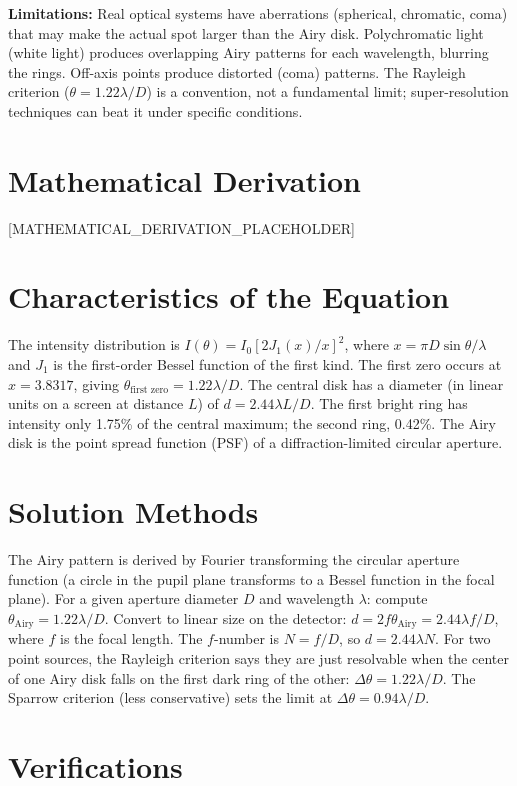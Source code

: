 \documentclass[11pt,openright]{book}
\begin{document}
\textbf{Limitations:} Real optical systems have aberrations (spherical, chromatic, coma) that may make the actual spot larger than the Airy disk. Polychromatic light (white light) produces overlapping Airy patterns for each wavelength, blurring the rings. Off-axis points produce distorted (coma) patterns. The Rayleigh criterion ($\theta = 1.22\lambda/D$) is a convention, not a fundamental limit; super-resolution techniques can beat it under specific conditions.


\section*{Mathematical Derivation}

[MATHEMATICAL_DERIVATION_PLACEHOLDER]

\section*{Characteristics of the Equation}

The intensity distribution is $I(\theta) = I_0\left[2J_1(x)/x\right]^2$, where $x = \pi D\sin\theta/\lambda$ and $J_1$ is the first-order Bessel function of the first kind. The first zero occurs at $x = 3.8317$, giving $\theta_{\text{first zero}} = 1.22\lambda/D$. The central disk has a diameter (in linear units on a screen at distance $L$) of $d = 2.44\lambda L/D$. The first bright ring has intensity only 1.75\% of the central maximum; the second ring, 0.42\%. The Airy disk is the point spread function (PSF) of a diffraction-limited circular aperture.
\section*{Solution Methods}

The Airy pattern is derived by Fourier transforming the circular aperture function (a circle in the pupil plane transforms to a Bessel function in the focal plane). For a given aperture diameter $D$ and wavelength $\lambda$: compute $\theta_{\text{Airy}} = 1.22\lambda/D$. Convert to linear size on the detector: $d = 2f\theta_{\text{Airy}} = 2.44\lambda f/D$, where $f$ is the focal length. The $f$-number is $N = f/D$, so $d = 2.44\lambda N$. For two point sources, the Rayleigh criterion says they are just resolvable when the center of one Airy disk falls on the first dark ring of the other: $\Delta\theta = 1.22\lambda/D$. The Sparrow criterion (less conservative) sets the limit at $\Delta\theta = 0.94\lambda/D$.
\section*{Verifications}
\end{document}
